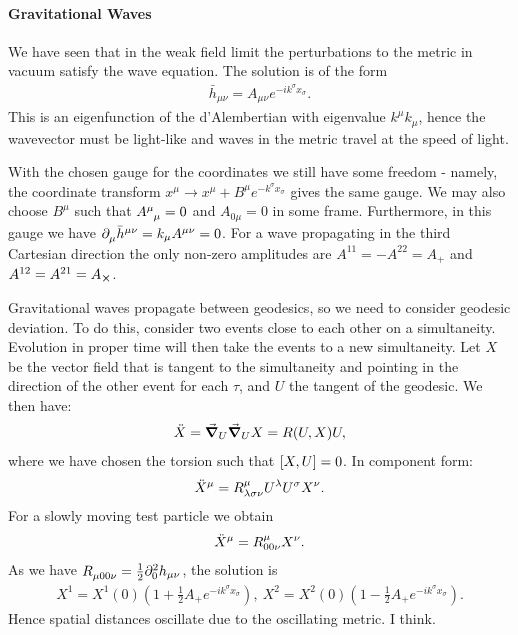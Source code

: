 \paragraph{Gravitational Waves}
We have seen that in the weak field limit the perturbations to the metric in vacuum satisfy the wave equation. The solution is of the form
\begin{align*}
	\bar{h}_{\mu\nu} = A_{\mu\nu}e^{-ik^{\sigma}x_{\sigma}}.
\end{align*}
This is an eigenfunction of the d'Alembertian with eigenvalue $k^{\mu}k_{\mu}$, hence the wavevector must be light-like and waves in the metric travel at the speed of light.

With the chosen gauge for the coordinates we still have some freedom - namely, the coordinate transform $x^{\mu} \to x^{\mu} + B^{\mu}e^{-k^{\sigma}x_{\sigma}}$ gives the same gauge. We may also choose $B^{\mu}$ such that $\tensor{A}{^{\mu}_{\mu}} = 0$ and $A_{0\mu} = 0$ in some frame. Furthermore, in this gauge we have $\partial^{}_{\mu}\bar{h}^{\mu\nu} = k_{\mu}A^{\mu\nu} = 0$. For a wave propagating in the third Cartesian direction the only non-zero amplitudes are $A^{11} = -A^{22} = A_{+}$ and $A^{12} = A^{21} = A_{\cross}$.

Gravitational waves propagate between geodesics, so we need to consider geodesic deviation. To do this, consider two events close to each other on a simultaneity. Evolution in proper time will then take the events to a new simultaneity. Let $X$ be the vector field that is tangent to the simultaneity and pointing in the direction of the other event for each $\tau$, and $U$ the tangent of the geodesic. We then have:
\begin{align*}
	\ddot{X} = \grad_{U}{\grad_{U}{X}} = R(U, X)U,
\end{align*}
where we have chosen the torsion such that $\comm{X}{U} = 0$. In component form:
\begin{align*}
	\ddot{X}^{\mu} = \tensor*{R}{^{\mu}_{\lambda\sigma\nu}}U^{\lambda}U^{\sigma}X^{\nu}.
\end{align*}
For a slowly moving test particle we obtain
\begin{align*}
	\ddot{X}^{\mu} = \tensor*{R}{^{\mu}_{00\nu}}X^{\nu}.
\end{align*}
As we have $\tensor*{R}{_{\mu 00\nu}} = \frac{1}{2}\del[2]{0}{h_{\mu\nu}}$, the solution is
\begin{align*}
	X^{1} = X^{1}(0)\left(1 + \frac{1}{2}A_{+}e^{-ik^{\sigma}x_{\sigma}}\right),\ X^{2} = X^{2}(0)\left(1 - \frac{1}{2}A_{+}e^{-ik^{\sigma}x_{\sigma}}\right).
\end{align*}
Hence spatial distances oscillate due to the oscillating metric. I think.